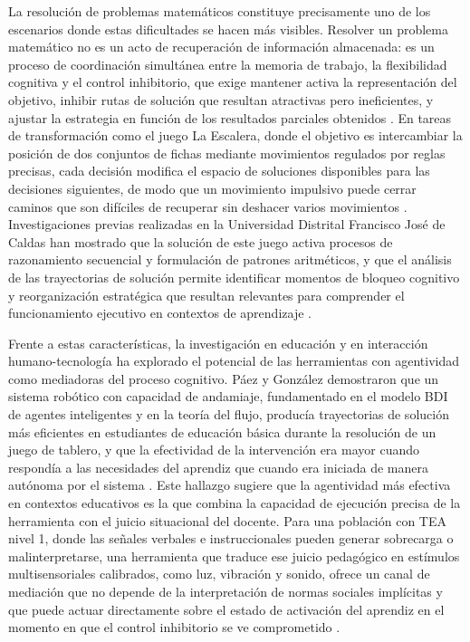 \documentclass{book}
\begin{document}
La resolución de problemas matemáticos constituye 
precisamente uno de los escenarios donde estas 
dificultades se hacen más visibles. Resolver un 
problema matemático no es un acto de recuperación 
de información almacenada: es un proceso de 
coordinación simultánea entre la memoria de trabajo, 
la flexibilidad cognitiva y el control inhibitorio, 
que exige mantener activa la representación del 
objetivo, inhibir rutas de solución que resultan 
atractivas pero ineficientes, y ajustar la estrategia 
en función de los resultados parciales obtenidos 
\cite{Diamond2013, Baddeley2000}. En tareas de 
transformación como el juego La Escalera, donde 
el objetivo es intercambiar la posición de dos 
conjuntos de fichas mediante movimientos regulados 
por reglas precisas, cada decisión modifica el 
espacio de soluciones disponibles para las 
decisiones siguientes, de modo que un movimiento 
impulsivo puede cerrar caminos que son difíciles 
de recuperar sin deshacer varios movimientos \cite{PaezGonzalez2022}. 
Investigaciones previas realizadas en la Universidad 
Distrital Francisco José de Caldas han mostrado que 
la solución de este juego activa procesos de 
razonamiento secuencial y formulación de patrones 
aritméticos, y que el análisis de las trayectorias 
de solución permite identificar momentos de bloqueo 
cognitivo y reorganización estratégica que resultan 
relevantes para comprender el funcionamiento 
ejecutivo en contextos de aprendizaje 
\cite{Cardenas2017, RodriguezLopez2017, Natalia2017}.

Frente a estas características, la investigación 
en educación y en interacción humano-tecnología 
ha explorado el potencial de las herramientas 
con agentividad como mediadoras del proceso 
cognitivo. Páez y González demostraron que un 
sistema robótico con capacidad de andamiaje, 
fundamentado en el modelo BDI de agentes 
inteligentes y en la teoría del flujo, producía 
trayectorias de solución más eficientes en 
estudiantes de educación básica durante la 
resolución de un juego de tablero, y que la 
efectividad de la intervención era mayor cuando 
respondía a las necesidades del aprendiz que 
cuando era iniciada de manera autónoma por el 
sistema \cite{PaezGonzalez2022}. Este hallazgo 
sugiere que la agentividad más efectiva en 
contextos educativos es la que combina la 
capacidad de ejecución precisa de la herramienta 
con el juicio situacional del docente. Para 
una población con TEA nivel 1, donde las 
señales verbales e instruccionales pueden generar 
sobrecarga o malinterpretarse, una herramienta 
que traduce ese juicio pedagógico en estímulos 
multisensoriales calibrados, como luz, vibración 
y sonido, ofrece un canal de mediación que no 
depende de la interpretación de normas sociales 
implícitas y que puede actuar directamente 
sobre el estado de activación del aprendiz 
en el momento en que el control inhibitorio 
se ve comprometido \cite{APA2022, Wood1976, 
PaezGonzalez2022}.
\end{document}

